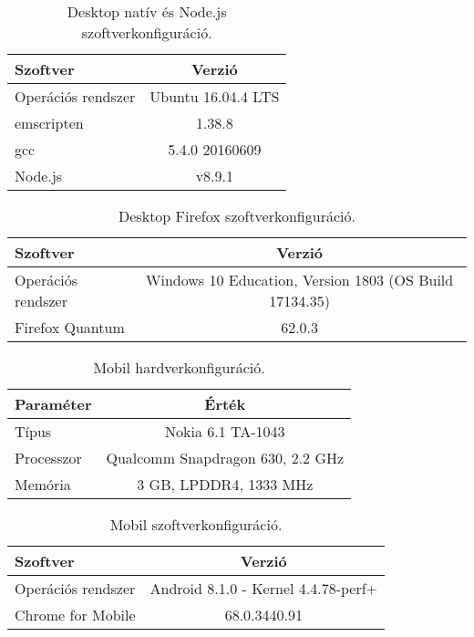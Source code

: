 \begin{table}[h!]
\captionsetup{justification=centering}
\centering
  \begin{tabular}{|| l | c ||}
  \hline
  Szoftver & Verzió \\
  \hline \hline
  Operációs rendszer & Ubuntu 16.04.4 LTS \\
  \hline
  emscripten & 1.38.8 \\
  gcc & 5.4.0 20160609 \\
  Node.js & v8.9.1 \\
  \hline
  \end{tabular}
\caption{Desktop natív és Node.js szoftverkonfiguráció.}  
\label{Fuggelek::Table::BenchmarkDesktopNativeSoftware}
\end{table}

\begin{table}[h!]
\captionsetup{justification=centering}
\centering
  \begin{tabular}{|| l | c ||}
  \hline
  Szoftver & Verzió \\
  \hline \hline
  Operációs rendszer & Windows 10 Education, Version 1803 (OS Build 17134.35) \\
  \hline
  Firefox Quantum & 62.0.3 \\
  \hline
  \end{tabular}
\caption{Desktop Firefox szoftverkonfiguráció.}  
\label{Fuggelek::Table::BenchmarkDesktopFirefoxSoftware}
\end{table}

\begin{table}[h!]
\captionsetup{justification=centering}
\centering
  \begin{tabular}{|| l | c ||}
  \hline
  Paraméter & Érték \\
  \hline \hline
  Típus        & Nokia 6.1 TA-1043 \\
  Processzor   & Qualcomm Snapdragon 630, 2.2 GHz \\
  Memória      & 3 GB, LPDDR4, 1333 MHz \\
  \hline
  \end{tabular}
\caption{Mobil hardverkonfiguráció.}  
\label{Fuggelek::Table::BenchmarkMobileHardware}
\end{table}

\begin{table}[H]
\captionsetup{justification=centering}
\centering
  \begin{tabular}{|| l | c ||}
  \hline
  Szoftver & Verzió \\
   \hline \hline
  Operációs rendszer & Android 8.1.0 - Kernel 4.4.78-perf+ \\
  \hline
  Chrome for Mobile & 68.0.3440.91 \\
  \hline
  \end{tabular}
\caption{Mobil szoftverkonfiguráció.}  
\label{Fuggelek::Table::BenchmarkMobileSoftware}
\end{table}

